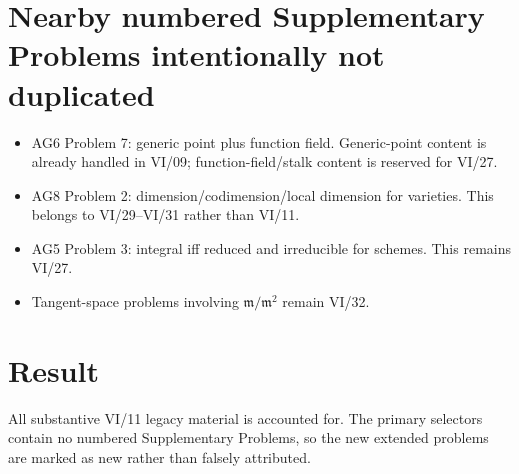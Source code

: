 \section*{Nearby numbered Supplementary Problems intentionally not duplicated}
\begin{itemize}
\item AG6 Problem 7: generic point plus function field.  Generic-point content is already
      handled in VI/09; function-field/stalk content is reserved for VI/27.
\item AG8 Problem 2: dimension/codimension/local dimension for varieties.  This belongs to
      VI/29--VI/31 rather than VI/11.
\item AG5 Problem 3: integral iff reduced and irreducible for schemes.  This remains VI/27.
\item Tangent-space problems involving $\mathfrak m/\mathfrak m^2$ remain VI/32.
\end{itemize}

\section*{Result}
All substantive VI/11 legacy material is accounted for.  The primary selectors contain no
numbered Supplementary Problems, so the new extended problems are marked as new rather than falsely attributed.
